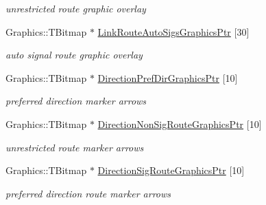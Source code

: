 \begin{DoxyCompactItemize}
\begin{DoxyCompactList}\small\item\em unrestricted route graphic overlay \end{DoxyCompactList}\item 
\mbox{\label{class_t_rail_graphics_a46fb422f45d1181fb8d2bc30167f2dc1}} 
Graphics\+::\+T\+Bitmap $\ast$ \mbox{\hyperlink{class_t_rail_graphics_a46fb422f45d1181fb8d2bc30167f2dc1}{Link\+Route\+Auto\+Sigs\+Graphics\+Ptr}} \mbox{[}30\mbox{]}
\begin{DoxyCompactList}\small\item\em auto signal route graphic overlay \end{DoxyCompactList}\item 
\mbox{\label{class_t_rail_graphics_a152061f5e559e36956bbc4e7e33b6122}} 
Graphics\+::\+T\+Bitmap $\ast$ \mbox{\hyperlink{class_t_rail_graphics_a152061f5e559e36956bbc4e7e33b6122}{Direction\+Pref\+Dir\+Graphics\+Ptr}} \mbox{[}10\mbox{]}
\begin{DoxyCompactList}\small\item\em preferred direction marker arrows \end{DoxyCompactList}\item 
\mbox{\label{class_t_rail_graphics_aca92d2e2beb58376b41a1f41c944e144}} 
Graphics\+::\+T\+Bitmap $\ast$ \mbox{\hyperlink{class_t_rail_graphics_aca92d2e2beb58376b41a1f41c944e144}{Direction\+Non\+Sig\+Route\+Graphics\+Ptr}} \mbox{[}10\mbox{]}
\begin{DoxyCompactList}\small\item\em unrestricted route marker arrows \end{DoxyCompactList}\item 
\mbox{\label{class_t_rail_graphics_aa35e6363b01e557c7ec995ff23d4469f}} 
Graphics\+::\+T\+Bitmap $\ast$ \mbox{\hyperlink{class_t_rail_graphics_aa35e6363b01e557c7ec995ff23d4469f}{Direction\+Sig\+Route\+Graphics\+Ptr}} \mbox{[}10\mbox{]}
\begin{DoxyCompactList}\small\item\em preferred direction route marker arrows \end{DoxyCompactList}\item 
\mbox{\label{class_t_rail_graphics_ab0775db98387eb5c22ba0b1f4daa8efe}} 

\end{DoxyCompactItemize}
